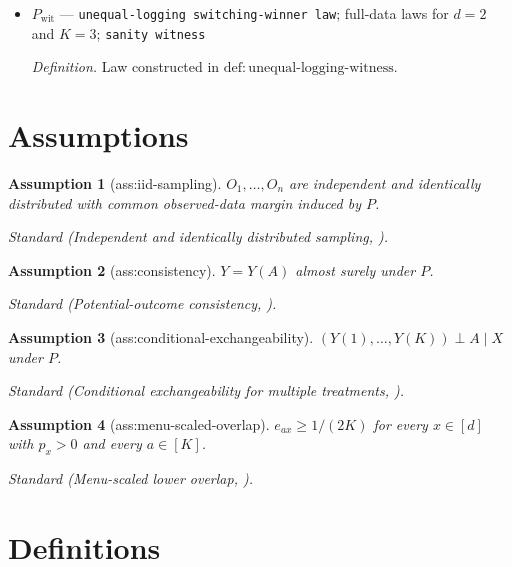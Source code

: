\documentclass{article}
\newtheorem{assumption}{Assumption}
\begin{document}
\begin{itemize}
  \par\smallskip\noindent\emph{Definition.} Kernel constructed in \(\mathrm{def{:}binary\text{-}grouping\text{-}channel}\).
  \item \(P_{\mathrm{wit}}\) --- \texttt{unequal-\allowbreak{}logging switching-\allowbreak{}winner law}; full-data laws for \(d=2\) and \(K=3\); \texttt{sanity witness}
  \par\smallskip\noindent\emph{Definition.} Law constructed in \(\mathrm{def{:}unequal\text{-}logging\text{-}witness}\).
\end{itemize}

\section{Assumptions}

\begin{assumption}[ass:iid-sampling]\label{ass:iid-sampling}
\(O_1,\ldots,O_n\) are independent and identically distributed with common observed-data margin induced by \(P\).
\par\smallskip\noindent\emph{Standard} (Independent and identically distributed sampling, \cite{LuedtkeVanderLaan2016}).
\end{assumption}

\begin{assumption}[ass:consistency]\label{ass:consistency}
\(Y=Y(A)\) almost surely under \(P\).
\par\smallskip\noindent\emph{Standard} (Potential-outcome consistency, \cite{LuedtkeVanderLaan2016}).
\end{assumption}

\begin{assumption}[ass:conditional-exchangeability]\label{ass:conditional-exchangeability}
\((Y(1),\ldots,Y(K))\perp A\mid X\) under \(P\).
\par\smallskip\noindent\emph{Standard} (Conditional exchangeability for multiple treatments, \cite{LuedtkeVanderLaan2016}).
\end{assumption}

\begin{assumption}[ass:menu-scaled-overlap]\label{ass:menu-scaled-overlap}
\(e_{ax}\ge1/(2K)\) for every \(x\in[d]\) with \(p_x>0\) and every \(a\in[K]\).
\par\smallskip\noindent\emph{Standard} (Menu-scaled lower overlap, \cite{ZhouAtheyWager2023}).
\end{assumption}

\section{Definitions}
\end{document}
